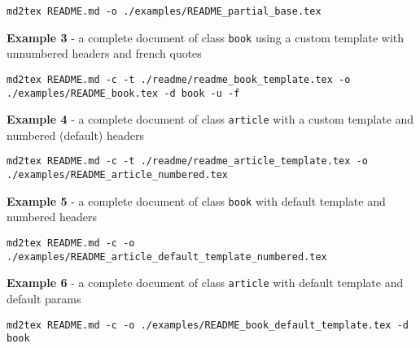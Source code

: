 \documentclass[a4paper, 12pt, twoside]{book}
\begin{document}
\begin{listing}[h!]
   \begin{verbatim}
md2tex README.md -o ./examples/README_partial_base.tex

   \end{verbatim}
\end{listing}

\textbf{Example 3} - a complete document of class \texttt{book} using a custom template with unnumbered headers and french quotes

\begin{listing}[h!]
   \begin{verbatim}
md2tex README.md -c -t ./readme/readme_book_template.tex -o ./examples/README_book.tex -d book -u -f

   \end{verbatim}
\end{listing}

\textbf{Example 4} - a complete document of class \texttt{article} with a custom template and numbered (default) headers

\begin{listing}[h!]
   \begin{verbatim}
md2tex README.md -c -t ./readme/readme_article_template.tex -o ./examples/README_article_numbered.tex

   \end{verbatim}
\end{listing}

\textbf{Example 5} - a complete document of class \texttt{book} with default template and numbered headers

\begin{listing}[h!]
   \begin{verbatim}
md2tex README.md -c -o ./examples/README_article_default_template_numbered.tex

   \end{verbatim}
\end{listing}

\textbf{Example 6} - a complete document of class \texttt{article} with default template and default params

\begin{listing}[h!]
   \begin{verbatim}
md2tex README.md -c -o ./examples/README_book_default_template.tex -d book

   \end{verbatim}
\end{listing}
\end{document}
